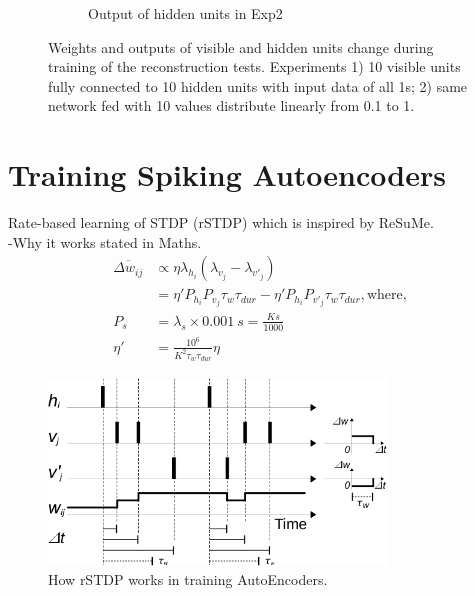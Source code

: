 \begin{figure}
\begin{subfigure}[t]{0.4\textwidth}
			\caption{Output of hidden units in Exp2}
		\end{subfigure}
		\caption{Weights and outputs of visible and hidden units change during training of the reconstruction tests. 
			Experiments 1) 10 visible units fully connected to 10 hidden units with input data of all 1s; 2) same network fed with 10 values distribute linearly from 0.1 to 1.}
	\end{figure}
	
\section{Training Spiking Autoencoders}
Rate-based learning of STDP (rSTDP) which is inspired by ReSuMe.\\
-Why it works stated in Maths.\\
\begin{equation}
\begin{aligned}
\overline{\Delta w_{ij}} &\propto \eta \lambda_{h_i}(\lambda_{v_j} - \lambda_{v'_j})\\
&=\eta'P_{h_i}P_{v_j}\tau_{w} \tau_{dur} - \eta'P_{h_i}P_{v'_j}\tau_{w} \tau_{dur}, \textrm{where,}\\
P_{s} &= \lambda_{s} \times 0.001~s = \frac{K s}{1000}\\
\eta' &= \frac{10^6}{K^2 \tau_{w} \tau_{dur}} \eta
\end{aligned}
\end{equation}

\begin{figure}
	\centering
	\includegraphics[width=0.8\textwidth]{pics_ae/rSTDP.pdf}
	\caption{How rSTDP works in training AutoEncoders.}
	\label{fig:rSTDP}
\end{figure}
	
